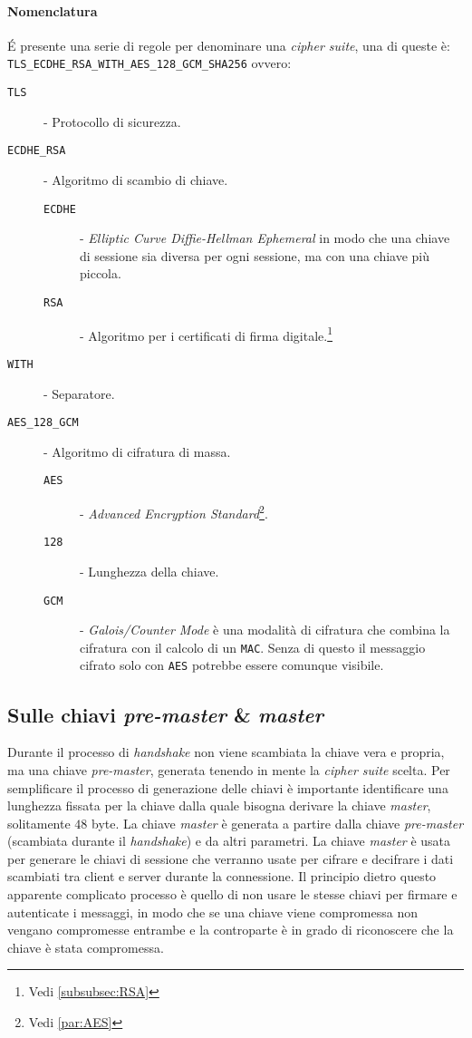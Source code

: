         \paragraph{Nomenclatura} É presente una serie di regole per denominare una \textit{cipher suite}, una di queste è:\newline
        \texttt{TLS\_ECDHE\_RSA\_WITH\_AES\_128\_GCM\_SHA256} ovvero:\begin{description}
            \item[\texttt{TLS}] - Protocollo di sicurezza.
            \item[\texttt{ECDHE\_RSA}] - Algoritmo di scambio di chiave.\begin{description}
                \item[\texttt{ECDHE}] - \textit{Elliptic Curve Diffie-Hellman Ephemeral} in modo che una chiave di sessione sia diversa per ogni sessione, ma con una chiave più piccola.
                \item[\texttt{RSA}] - Algoritmo per i certificati di firma digitale.\footnote{Vedi \ref{subsubsec:RSA}}
            \end{description}   
            \item[\texttt{WITH}] - Separatore.
            \item[\texttt{AES\_128\_GCM}] - Algoritmo di cifratura di massa.\begin{description}
                \item[\texttt{AES}] - \textit{Advanced Encryption Standard}\footnote{Vedi \ref{par:AES}}.
                \item[\texttt{128}] - Lunghezza della chiave.
                \item[\texttt{GCM}] - \textit{Galois/Counter Mode} è una modalità di cifratura che combina la cifratura con il calcolo di un \texttt{MAC}. Senza di questo il messaggio cifrato solo con \texttt{AES} potrebbe essere comunque visibile.
            \end{description}
        \end{description}
    \subsection{Sulle chiavi \textit{pre-master} \& \textit{master}}
        Durante il processo di \textit{handshake} non viene scambiata la chiave vera e propria, ma una chiave \textit{pre-master}, generata tenendo in mente la \textit{cipher suite} scelta. Per semplificare il processo di generazione delle chiavi è importante identificare una lunghezza fissata per la chiave dalla quale bisogna derivare la chiave \textit{master}, solitamente $ 48 $ byte. La chiave \textit{master} è generata a partire dalla chiave \textit{pre-master} (scambiata durante il \textit{handshake}) e da altri parametri. La chiave \textit{master} è usata per generare le chiavi di sessione che verranno usate per cifrare e decifrare i dati scambiati tra client e server durante la connessione. Il principio dietro questo apparente complicato processo è quello di non usare le stesse chiavi per firmare e autenticate i messaggi, in modo che se una chiave viene compromessa non vengano compromesse entrambe e la controparte è in grado di riconoscere che la chiave è stata compromessa.
